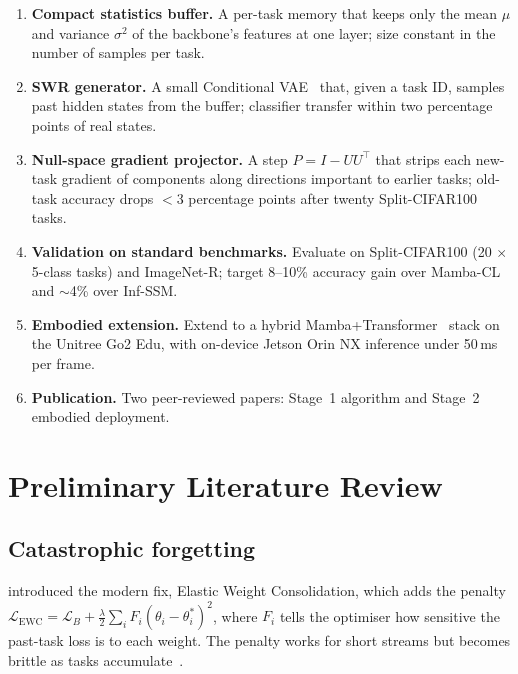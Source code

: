 \documentclass[11pt,a4paper]{article}
\newcommand{\objbold}[1]{\textbf{\color{neuroblue}#1}}
\begin{document}
\begin{enumerate}[label=\textbf{O\arabic*.},leftmargin=2.2em,itemsep=0.05em,topsep=0.1em]
  \item \objbold{Compact statistics buffer.} A per-task memory that keeps only the mean $\mu$ and variance $\sigma^{2}$ of the backbone's features at one layer; size constant in the number of samples per task.
  \item \objbold{SWR generator.} A small Conditional VAE~\citep{sohn2015learning} that, given a task ID, samples past hidden states from the buffer; classifier transfer within two percentage points of real states.
  \item \objbold{Null-space gradient projector.} A step $P=I-UU^{\top}$ that strips each new-task gradient of components along directions important to earlier tasks; old-task accuracy drops $<\!3$ percentage points after twenty Split-CIFAR100 tasks.
  \item \objbold{Validation on standard benchmarks.} Evaluate on Split-CIFAR100 (20 $\times$ 5-class tasks) and ImageNet-R; target 8--10\% accuracy gain over Mamba-CL and $\sim$4\% over Inf-SSM.
  \item \objbold{Embodied extension.} Extend to a hybrid Mamba+Transformer~\citep{vaswani2017attention} stack on the Unitree Go2 Edu, with on-device Jetson Orin NX inference under 50\,ms per frame.
  \item \objbold{Publication.} Two peer-reviewed papers: Stage~1 algorithm and Stage~2 embodied deployment.
\end{enumerate}

\section{Preliminary Literature Review}

\subsection{Catastrophic forgetting}
\citet{kirkpatrick2017overcoming} introduced the modern fix, Elastic Weight Consolidation, which adds the penalty $\mathcal{L}_{\text{EWC}} = \mathcal{L}_{B} + \tfrac{\lambda}{2}\sum_{i} F_{i}(\theta_{i}-\theta_{i}^{*})^{2}$, where $F_i$ tells the optimiser how sensitive the past-task loss is to each weight. The penalty works for short streams but becomes brittle as tasks accumulate~\citep{delange2022continual}.
\end{document}
